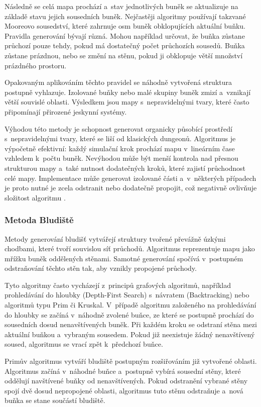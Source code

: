 \documentclass[
   program=itk,
   biblatex,
   figures=true,
   tables=true,
   glossaries,
   index
]{kidiplom}
\begin{document}
Následně se celá mapa prochází a~stav jednotlivých buněk se aktualizuje na základě stavu jejich sousedních buněk. Nejčastěji algoritmy používají takzvané Mooreovo sousedství, které zahrnuje osm buněk obklopujících aktuální buňku. Pravidla generování bývají různá. Mohou například určovat, že buňka zůstane průchozí pouze tehdy, pokud má dostatečný počet průchozích sousedů. Buňka zůstane prázdnou, nebo se změní na stěnu, pokud ji obklopuje větší množství prázdného prostoru.

Opakovaným aplikováním těchto pravidel se náhodně vytvořená struktura postupně vyhlazuje. Izolované buňky nebo malé skupiny buněk zmizí a~vznikají větší souvislé oblasti. Výsledkem jsou mapy s~nepravidelnými tvary, které často připomínají přirozené jeskynní systémy.

Výhodou této metody je schopnost generovat organicky působící prostředí s~nepravidelnými tvary, které se liší od klasických dungeonů. Algoritmus je výpočetně efektivní: každý simulační krok prochází mapu v~lineárním čase vzhledem k~počtu buněk. Nevýhodou může být menší kontrola nad přesnou strukturou mapy a~také nutnost dodatečných kroků, které zajistí průchodnost celé mapy. Implementace může generovat izolované části a~v~některých případech je proto nutné je zcela odstranit nebo dodatečně propojit, což negativně ovlivňuje složitost algoritmu \cite{Linden2014,Shaker2016}.

\subsubsection{Metoda Bludiště}

Metody generování bludišť vytvářejí struktury tvořené převážně úzkými chodbami, které tvoří souvislou síť průchodů. Algoritmus reprezentuje mapu jako mřížku buněk oddělených stěnami. Samotné generování spočívá v~postupném odstraňování těchto stěn tak, aby vznikly propojené průchody.

Tyto algoritmy často vycházejí z~principů grafových algoritmů, například prohledávání do hloubky (Depth-First Search) s~návratem (Backtracking) nebo algoritmů typu Prim či Kruskal. V~případě algoritmu založeného na prohledávání do hloubky se začíná v~náhodně zvolené buňce, ze které se postupně prochází do sousedních dosud nenavštívených buněk. Při každém kroku se odstraní stěna mezi aktuální buňkou a~vybraným sousedem. Pokud již neexistuje žádný nenavštívený soused, algoritmus se vrací zpět k~předchozí buňce.

Primův algoritmus vytváří bludiště postupným rozšiřováním již vytvořené oblasti. Algoritmus začíná v~náhodné buňce a~postupně vybírá sousední stěny, které oddělují navštívené buňky od nenavštívených. Pokud odstranění vybrané stěny spojí dvě dosud nepropojené oblasti, algoritmus tuto stěnu odstraňuje a~nová buňka se stane součástí bludiště.
\end{document}

